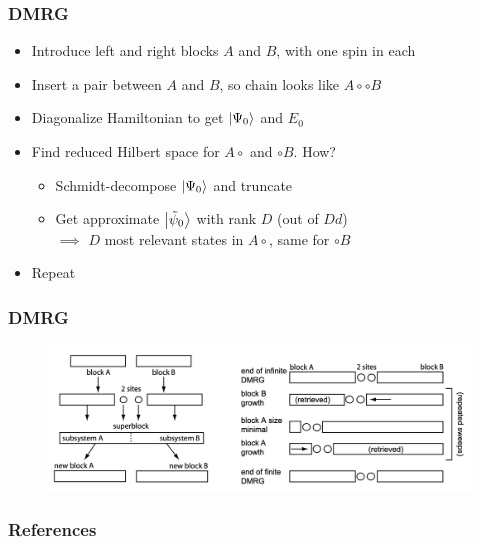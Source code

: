 \documentclass{beamer}
\theoremstyle{definition}
\begin{document}
\begin{frame}

\frametitle{DMRG}

\pause
\begin{itemize}
\item Introduce left and right blocks $A$ and $B$, with one spin in each \pause
\vspace{8pt}
\item Insert a pair between $A$ and $B$, so chain looks like $A \circ \circ B$ \pause
\vspace{8pt}
\item Diagonalize Hamiltonian to get $\ket{\Psi_0}$ and $E_0$ \pause
\vspace{8pt}
\item Find reduced Hilbert space for $A\circ$ and $\circ B$. How? \vspace{5pt}  \pause
	\begin{itemize}
	\item Schmidt-decompose $\ket{\Psi_0}$ and truncate \vspace{5pt}
	\item Get approximate $\ket{\tilde{\psi}_0}$ with rank $D$ (out of $Dd$) \vspace{5pt}\\
	$\implies$  $D$ most relevant states in $A\circ$, same for $\circ B$
	\end{itemize} 
	\vspace{8pt} \pause
\item Repeat
\end{itemize}
\end{frame}


\begin{frame}
\frametitle{DMRG}
\begin{figure}[!htb]
\centering
\includegraphics[scale=0.33]{DMRG.PNG}
\end{figure}
\end{frame}

\begin{frame}
	\frametitle{References}
	
	\nocite{*}
	
	
\end{frame}
\end{document}
